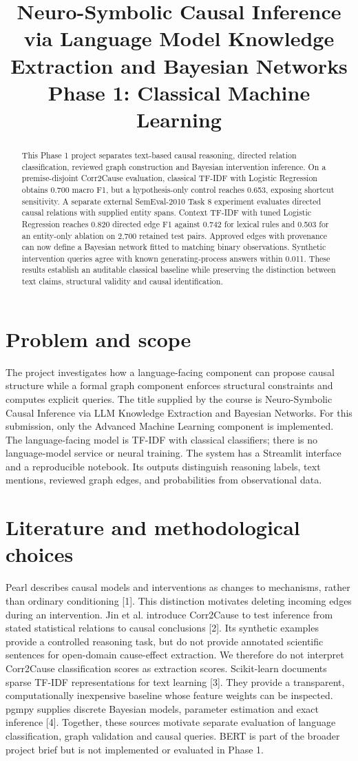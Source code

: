 \documentclass[conference]{IEEEtran}
\title{Neuro-Symbolic Causal Inference via Language Model Knowledge Extraction and Bayesian Networks\\Phase 1: Classical Machine Learning}
\author{\IEEEauthorblockN{Yug Johri, Vidit Sachan, Aditya Verma, Kaavya Gala, Ishita Thakur}\IEEEauthorblockA{Team T094, Section E\\Newton School of Technology, Rishihood University}}
\begin{document}
\maketitle
\begin{abstract}This Phase 1 project separates text-based causal reasoning, directed relation classification, reviewed graph construction and Bayesian intervention inference. On a premise-disjoint Corr2Cause evaluation, classical TF-IDF with Logistic Regression obtains 0.700 macro F1, but a hypothesis-only control reaches 0.653, exposing shortcut sensitivity. A separate external SemEval-2010 Task 8 experiment evaluates directed causal relations with supplied entity spans. Context TF-IDF with tuned Logistic Regression reaches 0.820 directed edge F1 against 0.742 for lexical rules and 0.503 for an entity-only ablation on 2,700 retained test pairs. Approved edges with provenance can now define a Bayesian network fitted to matching binary observations. Synthetic intervention queries agree with known generating-process answers within 0.011. These results establish an auditable classical baseline while preserving the distinction between text claims, structural validity and causal identification.\end{abstract}
\section{Problem and scope}
The project investigates how a language-facing component can propose causal structure while a formal graph component enforces structural constraints and computes explicit queries. The title supplied by the course is Neuro-Symbolic Causal Inference via LLM Knowledge Extraction and Bayesian Networks. For this submission, only the Advanced Machine Learning component is implemented. The language-facing model is TF-IDF with classical classifiers; there is no language-model service or neural training. The system has a Streamlit interface and a reproducible notebook. Its outputs distinguish reasoning labels, text mentions, reviewed graph edges, and probabilities from observational data.
\section{Literature and methodological choices}
Pearl describes causal models and interventions as changes to mechanisms, rather than ordinary conditioning [1]. This distinction motivates deleting incoming edges during an intervention. Jin et al. introduce Corr2Cause to test inference from stated statistical relations to causal conclusions [2]. Its synthetic examples provide a controlled reasoning task, but do not provide annotated scientific sentences for open-domain cause-effect extraction. We therefore do not interpret Corr2Cause classification scores as extraction scores. Scikit-learn documents sparse TF-IDF representations for text learning [3]. They provide a transparent, computationally inexpensive baseline whose feature weights can be inspected. pgmpy supplies discrete Bayesian models, parameter estimation and exact inference [4]. Together, these sources motivate separate evaluation of language classification, graph validation and causal queries. BERT is part of the broader project brief but is not implemented or evaluated in Phase 1.
\end{document}
